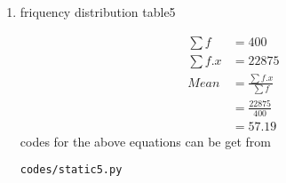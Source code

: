 \renewcommand{\theequation}{\theenumi}
\begin{enumerate}[label=\arabic*.,ref=\thesubsection.\theenumi]
\item \begin{table}[!ht]
	\centering
	
	\caption{friquency distribution table5 }
\end{table}
\begin{align}
\sum{f} &= 400
\\
\sum{f.x} &= 22875
\\
Mean &= \frac{\sum{f.x}}{\sum{f}}
\\ &= \frac{22875}{400}
\\&= 57.19
\end{align}
codes for the above equations can be get from
\begin{lstlisting}
codes/static5.py
\end{lstlisting}
\end{enumerate}